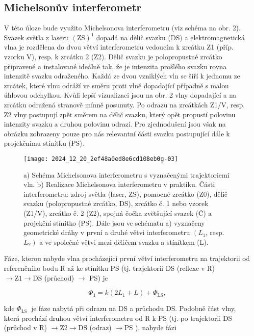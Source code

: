 \documentclass[czech,11pt,a4paper]{article}
\begin{document}
\begin{multicols}{2}
	\section*{Michelsonův interferometr}
	V této úloze bude využito Michelsonova interferometru (viz schéma na obr. 2). Svazek světla z laseru $(\mathrm{ZS})^{1}$ dopadá na dělič svazku (DS) a elektromagnetická vlna je rozdělena do dvou větví interferometru vedoucím k zrcátku Z1 (příp. vzorku V), resp. k zrcátku 2 (Z2). Dělič svazku je polopropustné zrcátko připravené a instalované ideálně tak, že je intenzita prošlého svazku rovna intenzitě svazku odraženého. Každá ze dvou vzniklých vln se šíří k jednomu ze zrcátek, které vlnu odráží ve směru proti vlně dopadající případně s malou úhlovou odchylkou. Kvůli lepší vizualizaci jsou na obr. 2 vlny dopadající a na zrcátku odražená stranově mínně posunuty. Po odrazu na zrcátkách Z1/V, resp. Z2 vlny postupují zpĕt směrem na dĕlič svazku, který opět propustí polovinu intenzity svazku a druhou polovinu odrazí. Pro zjednodušení jsou však na obrázku zobrazeny pouze pro nás relevantní části svazku postupující dále k projekčnímu stínítku (PS).\\
	
	\begin{figure}[H]
			\texttt{[image: 2024\_12\_20\_2ef48a0ed8e6cd108eb0g-03]}
			\caption{a) Schéma Michelsonova interferometru s vyznačenými trajektoriemi vln. b) Realizace Michelsonova interferometru v praktiku. Části interferometru: zdroj světla (laser, ZS), pomocné zrcátko (Z0), dělič svazku (polopropustné zrcátko, DS), zrcátko č. 1 nebo vzorek (Z1/V), zrcátko č. 2 (Z2), spojná čočka zvĕtšující svazek (Č) a projekční stínítko (PS). Dále jsou ve schématu a) vyznačeny geometrické dráhy v první a druhé větvi interferometru $\left(L_{1}\right.$, resp. $\left.L_{2}\right)$ a ve společné větvi mezi dĕličem svazku a stínítkem (L).}
	\end{figure}

	
	Fáze, kterou nabyde vlna procházející první vĕtví interferometru na trajektorii od referenčního bodu R až ke stínítku PS (tj. trajektorii DS (reflexe v R) $\rightarrow \mathrm{Z1} \rightarrow \mathrm{DS}$ (průchod) $\rightarrow$ PS) je
	
	\begin{equation}
		\Phi_{1}=k\left(2 L_{1}+L\right)+\Phi_{\mathrm{LS}},
	\end{equation}
	
	
	kde $\Phi_{\text {LS }}$ je fáze nabytá při odrazu na DS a průchodu DS. Podobně část vlny, která prochází druhou větví interferometru od R k PS (tj. po trajektorii DS (průchod v R) $\rightarrow \mathrm{Z} 2 \rightarrow \mathrm{DS}$ (odraz) $\rightarrow \mathrm{PS}$ ), nabyde fázi
	

\end{multicols}
\end{document}
